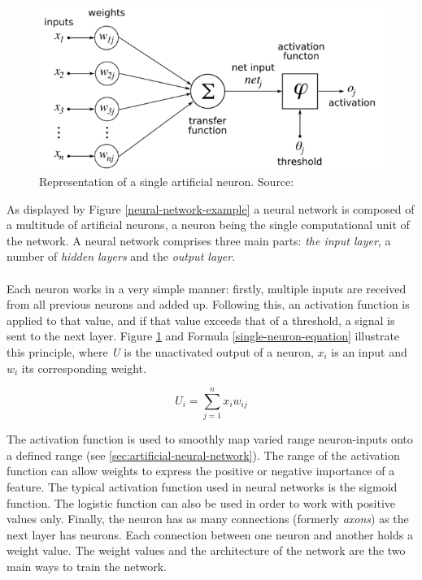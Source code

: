 \documentclass[a4paper,12pt, oneside]{memoir}
\begin{document}
\begin{figure}[!ht]
  \centering
  \includegraphics[scale=0.5] {ModelOfArtificialNeuron}
  \caption {Representation of a single artificial neuron. Source: \cite{wiki-artificial-neuron}}
  \label{single-neuron-diagram}
\end{figure}

As displayed by Figure \ref{neural-network-example} a neural network is composed of a multitude of artificial neurons, a neuron being the single computational unit of the network. A neural network comprises three main parts: \textit{the input layer}, a number of \textit{hidden layers} and the \textit{output layer}. 
\\ \\
Each neuron works in a very simple manner: firstly, multiple inputs are received from all previous neurons and added up. Following this, an activation function is applied to that value, and if that value exceeds that of a threshold, a signal is sent to the next layer. Figure \ref{single-neuron-diagram} and Formula \eqref{single-neuron-equation} illustrate this principle, where \textit{U} is the unactivated output of a neuron, $x_i$ is an input and $w_i$ its corresponding weight. 

\begin{equation} \label{single-neuron-equation}
  U_i = \sum_{j=1}^{n} x_i w_{ij} 
\end{equation}

The activation function is used to smoothly map varied range neuron-inputs onto a defined range (see \ref{sec:artificial-neural-network}). The range of the activation function can allow weights to express the positive or negative importance of a feature. The typical activation function used in neural networks is the sigmoid function. The logistic function can also be used in order to work with positive values only. Finally, the neuron has as many connections (formerly \textit{axons}) as the next layer has neurons. Each connection between one neuron and another holds a weight value. The weight values and the architecture of the network are the two main ways to train the network.
\end{document}
